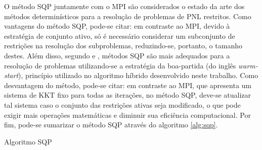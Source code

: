 \documentclass[
	12pt,				%
	openany,			%
	twoside,			%
	a4paper,			%
	chapter=TITLE,		%
	section=Title,		%
	subsection=Title,	%
	subsubsection=Title,%
	english,			%
	french,				%
	spanish,			%
	brazil			%
	]{abntex2}
\begin{document}
\begin{ERRATA}
O método SQP juntamente com o MPI são considerados o estado da arte dos métodos determinísticos para a resolução de problemas de PNL restritos. Como vantagens do método SQP, pode-se citar: em contraste ao MPI, devido à estratégia de conjunto ativo, só é necessário considerar um subconjunto de restrições na resolução dos subproblemas, reduzindo-se, portanto, o tamanho destes. Além disso, segundo   e , métodos SQP são mais adequados para a resolução de problemas utilizando-se a estratégia da boa-partida (do inglês \emph{warm-start}), princípio utilizado no algoritmo híbrido desenvolvido neste trabalho. Como desvantagem do método, pode-se citar: em contraste ao MPI, que apresenta um sistema de KKT fixo para todas as iterações, no método SQP, deve-se atualizar tal sistema caso o conjunto das restrições ativas seja modificado, o que pode exigir mais operações matemáticas e diminuir sua eficiência computacional. Por fim, pode-se sumarizar o método SQP através do algoritmo \ref{alg:sqp}. 

\begin{algorithm}[!h]
\caption{\label{alg:sqp} Algoritmo SQP}



\end{algorithm}
\end{ERRATA}
\end{document}
